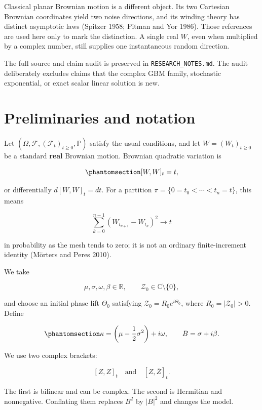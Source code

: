 \documentclass[
  english,
  10pt,
  letterpaper,
  DIV=11,
  numbers=noendperiod]{scrartcl}
\begin{document}
Classical planar Brownian motion is a different object. Its two
Cartesian Brownian coordinates yield two noise directions, and its
winding theory has distinct asymptotic laws (Spitzer 1958; Pitman and
Yor 1986). Those references are used here only to mark the distinction.
A single real \(W\), even when multiplied by a complex number, still
supplies one instantaneous random direction.

The full source and claim audit is preserved in
\texttt{RESEARCH\_NOTES.md}. The audit deliberately excludes claims that
the complex GBM family, stochastic exponential, or exact scalar linear
solution is new.

\section{Preliminaries and notation}\label{sec-preliminaries}

Let \((\Omega,\mathcal F,(\mathcal F_t)_{t\ge0},\mathbb P)\) satisfy the
usual conditions, and let \(W=(W_t)_{t\ge0}\) be a standard
\textbf{real} Brownian motion. Brownian quadratic variation is

\begin{equation}\protect\phantomsection\label{eq-brownian-bracket}{
[W,W]_t=t,
}\end{equation}

or differentially \(d[W,W]_t=dt\). For a partition
\(\pi=\{0=t_0<\cdots<t_n=t\}\), this means

\[
\sum_{k=0}^{n-1}(W_{t_{k+1}}-W_{t_k})^2
\longrightarrow t
\]

in probability as the mesh tends to zero; it is not an ordinary
finite-increment identity (Mörters and Peres 2010).

We take

\[
\mu,\sigma,\omega,\beta\in\mathbb R,\qquad
\mathcal Z_0\in\mathbb C\setminus\{0\},
\]

and choose an initial phase lift \(\Theta_0\) satisfying
\(\mathcal Z_0=R_0e^{i\Theta_0}\), where \(R_0=|\mathcal Z_0|>0\).
Define

\begin{equation}\protect\phantomsection\label{eq-kappa-B}{
\kappa
=
\left(\mu-\frac12\sigma^2\right)+i\omega,\qquad
B=\sigma+i\beta.
}\end{equation}

We use two complex brackets:

\[
[Z,Z]_t
\quad\text{and}\quad
[Z,\overline Z]_t.
\]

The first is bilinear and can be complex. The second is Hermitian and
nonnegative. Conflating them replaces \(B^2\) by \(|B|^2\) and changes
the model.
\end{document}
